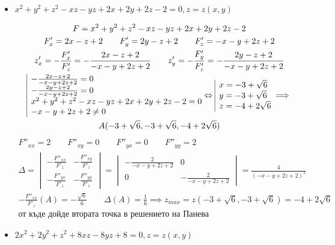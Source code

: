 \documentclass[a4paper,fleqn,12pt]{article}
\theoremstyle{definition}
\begin{document}
\begin{itemize}
\item $x^2 + y^2 + z^2 - xz -yz + 2x + 2y + 2z - 2 = 0, z = z(x,y)$

\begin{gather*}
F = x^2 + y^2 + z^2 - xz -yz + 2x + 2y + 2z - 2\\
F'_x = 2x - z + 2 \qquad F'_y = 2y - z + 2 \qquad F'_z = -x -y + 2z + 2 \\
z'_x = - \frac{F'_x}{F'_z} = - \frac{2x - z + 2}{-x -y + 2z + 2}\qquad z'_y = -\frac{F'_y}{F'_z} = -\frac{2y - z + 2}{-x -y + 2z + 2}\\
\begin{array}{|l@{}}
- \frac{2x - z + 2}{-x -y + 2z + 2} = 0 \\
-\frac{2y - z + 2}{-x -y + 2z + 2} = 0 \\
x^2 + y^2 + z^2 - xz -yz + 2x + 2y + 2z - 2 = 0\\
 -x -y + 2z + 2 \neq 0
\end{array}\Leftrightarrow 
\begin{array}{|l@{}}
x = -3 + \sqrt{6} \\
y = -3 + \sqrt{6} \\
z = -4 + 2\sqrt{6}
\end{array} \implies \\
A( -3 + \sqrt{6},-3 + \sqrt{6}, -4 + 2\sqrt{6})
\end{gather*}
\begin{gather*}
F''_{xx} =  2 \qquad F''_{xy} =  0 \qquad F''_{yx} = 0 \qquad F''_{yy} = 2 \\
\Delta = \begin{vmatrix} -\frac{F''_{xx}}{F'_z} &  -\frac{F''_{xy}}{F'_z} \\  -\frac{F''_{yx}}{F'_z} &  -\frac{F''_{yy}}{F'_z} \end{vmatrix} = \begin{vmatrix} -\frac{2}{ -x -y + 2z + 2 } & 0 \\  0 &  -\frac{2}{ -x -y + 2z + 2 } \end{vmatrix} = \frac{4}{( -x -y + 2z + 2 )^2} \\
-\frac{F''_{xx}}{F'_z} (A) = -\frac{\sqrt{6}}{6} \qquad \Delta(A) = \frac{1}{6} \implies z_{max} = z( -3 + \sqrt{6},-3 + \sqrt{6}) =  -4 + 2\sqrt{6}\\
\text{от къде дойде втората точка в решението на Панева}
\end{gather*}

\item $2x^2 + 2y^2 + z^2 + 8xz -8yz + 8 = 0, z = z(x,y)$


\end{itemize}
\end{document}
